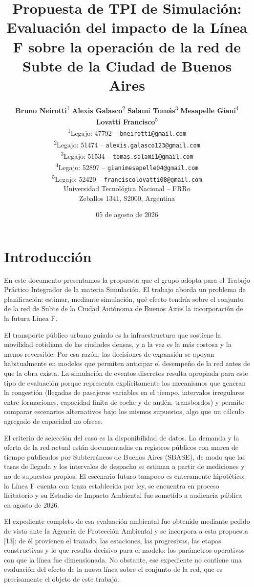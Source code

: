 \documentclass{article}
\title{Propuesta de TPI de Simulación: Evaluación del impacto de la Línea F sobre la operación de la red de Subte de la Ciudad de Buenos Aires}
\author{
  \textbf{Bruno Neirotti}\textsuperscript{1} \qquad \textbf{Alexis Galasco}\textsuperscript{2} \qquad \textbf{Salami Tomás}\textsuperscript{3} \qquad \textbf{Mesapelle Giani}\textsuperscript{4} \qquad \textbf{Lovatti Francisco}\textsuperscript{5} \\[0.5ex]
  \textsuperscript{1}Legajo: 47792 -- \texttt{bneirotti@gmail.com} \\
  \textsuperscript{2}Legajo: 51474 -- \texttt{alexis.galasco123@gmail.com} \\
  \textsuperscript{3}Legajo: 51534 -- \texttt{tomas.salami1@gmail.com} \\
  \textsuperscript{4}Legajo: 52897 -- \texttt{gianimesapelle04@gmail.com} \\
  \textsuperscript{5}Legajo: 52420 -- \texttt{franciscolovatti08@gmail.com} \\[0.5ex]
  Universidad Tecnológica Nacional -- FRRo \\
  Zeballos 1341, S2000, Argentina \\
}
\date{05 de agosto de 2026}
\begin{document}
\maketitle

\section{Introducción}

En este documento presentamos la propuesta que el grupo adopta para el Trabajo Práctico Integrador de la
materia Simulación. El trabajo aborda un problema de planificación: estimar, mediante simulación, qué
efecto tendría sobre el conjunto de la red de Subte de la Ciudad Autónoma de Buenos Aires la incorporación
de la futura Línea F.

El transporte público urbano guiado es la infraestructura que sostiene la movilidad cotidiana de las
ciudades densas, y a la vez es la más costosa y la menos reversible. Por esa razón, las decisiones de expansión
se apoyan habitualmente en modelos que permiten anticipar el desempeño de la red antes de que la obra
exista. La simulación de eventos discretos resulta apropiada para este tipo de evaluación porque
representa explícitamente los mecanismos que generan la congestión (llegadas de pasajeros variables en
el tiempo, intervalos irregulares entre formaciones, capacidad finita de coche y de andén, transbordos)
y permite comparar escenarios alternativos bajo los mismos supuestos, algo que un cálculo agregado de
capacidad no ofrece.

El criterio de selección del caso es la disponibilidad de datos. La demanda y la oferta de la red actual
están documentadas en registros públicos con marca de tiempo publicados por Subterráneos de Buenos Aires
(SBASE), de modo que las tasas de llegada y los intervalos de despacho se estiman a partir de mediciones y
no de supuestos propios. El escenario futuro tampoco es enteramente hipotético: la Línea F cuenta con traza
establecida por ley, se encuentra en proceso licitatorio y su Estudio de Impacto Ambiental fue sometido a
audiencia pública en agosto de 2026.

El expediente completo de esa evaluación ambiental fue obtenido
mediante pedido de vista ante la Agencia de Protección Ambiental y se incorpora a esta propuesta [13]: de él
provienen el trazado, las estaciones, las progresivas, las etapas constructivas y lo que resulta
decisivo para el modelo: los parámetros operativos con que la línea fue dimensionada. No obstante, ese
expediente no contiene una evaluación del efecto de la nueva línea sobre el conjunto de la red, que es
precisamente el objeto de este trabajo.
\end{document}
